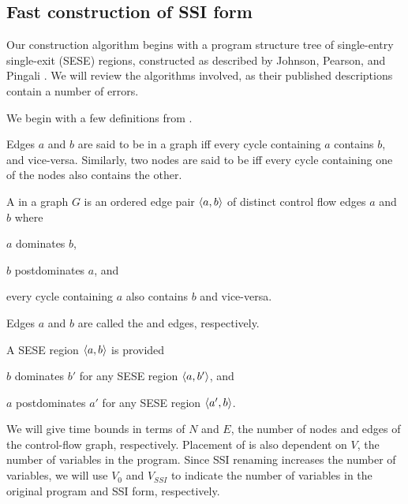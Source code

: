 \documentclass[12pt,titlepage,twoside]{article}
\begin{document}
\subsection{Fast construction of SSI form}
Our construction algorithm begins with a program structure tree of
single-entry single-exit (SESE) regions, constructed as described by
Johnson, Pearson, and Pingali \cite{johnson94:pst}.  We will review
the algorithms involved, as their published descriptions
\cite{johnson93:sese} contain a number of errors.

We begin with a few definitions from \cite{johnson94:pst}.
\begin{definition}
Edges $a$ and $b$ are said to be  in a
graph iff every cycle containing $a$ contains $b$, and vice-versa.
Similarly, two nodes are said to be  iff
every cycle containing one of the nodes also contains the other.
\end{definition}
\begin{definition}
A  in a graph $G$ is an ordered edge pair
$\left\langle a,b \right\rangle$ of distinct control flow edges $a$ and $b$ where
\begin{tightenum}
\item $a$ dominates $b$,
\item $b$ postdominates $a$, and
\item every cycle containing $a$ also contains $b$ and vice-versa.
\end{tightenum}
Edges $a$ and $b$ are called the  and  edges,
respectively.
\end{definition}
\begin{definition}
A SESE region $\left\langle a,b \right\rangle$ is  provided
\begin{tightenum}
\item $b$ dominates $b'$ for any SESE region $\left\langle a,b' \right\rangle$, and
\item $a$ postdominates $a'$ for any SESE region $\left\langle a',b \right\rangle$.
\end{tightenum}
\end{definition}

We will give time bounds in terms of $N$ and $E$, the number of nodes
and edges of the control-flow graph, respectively.
Placement of 
is also dependent on $V$, the number of variables in the program.
Since SSI renaming increases the number of variables, we will use
$V_0$ and $V_{SSI}$ to indicate the number of variables in the
original program and SSI form, respectively.
\end{document}
